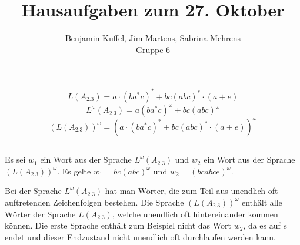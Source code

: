 \documentclass[10pt,a4paper,oneside,ngerman,numbers=noenddot]{scrartcl}
\begin{document}
\author{Benjamin Kuffel, Jim Martens, Sabrina Mehrens\\Gruppe 6}
\title{Hausaufgaben zum 27. Oktober}
\maketitle

\setcounter{section}{2}
\section{} %
	\subsection{} %
		\[L(A_{2.3}) = a \cdot (ba^{*}c)^{*} + bc(abc)^{*} \cdot (a + e)\]
		\[L^{\omega}(A_{2.3}) = a(ba^{*}c)^{\omega} + bc(abc)^{\omega}\]
		\[(L(A_{2.3}))^{\omega} = (a \cdot (ba^{*}c)^{*} + bc(abc)^{*} \cdot (a + e))^ {\omega}\]
	\subsection{} %
		Es sei \(w_{1}\) ein Wort aus der Sprache \(L^{\omega}(A_{2.3})\) und \(w_{2}\) ein Wort aus der Sprache \((L(A_{2.3}))^{\omega}\). Es gelte \(w_{1} = bc(abc)^{\omega}\) und \(w_{2} = (bcabce)^{\omega}\).
		
		Bei der Sprache \(L^{\omega}(A_{2.3})\) hat man Wörter, die zum Teil aus unendlich oft auftretenden Zeichenfolgen bestehen. Die Sprache \((L(A_{2.3}))^{\omega}\) enthält alle Wörter der Sprache \(L(A_{2.3})\), welche unendlich oft hintereinander kommen können. Die erste Sprache enthält zum Beispiel nicht das Wort \(w_{2}\), da es auf \(e\) endet und dieser Endzustand nicht unendlich oft durchlaufen werden kann.
\end{document}
